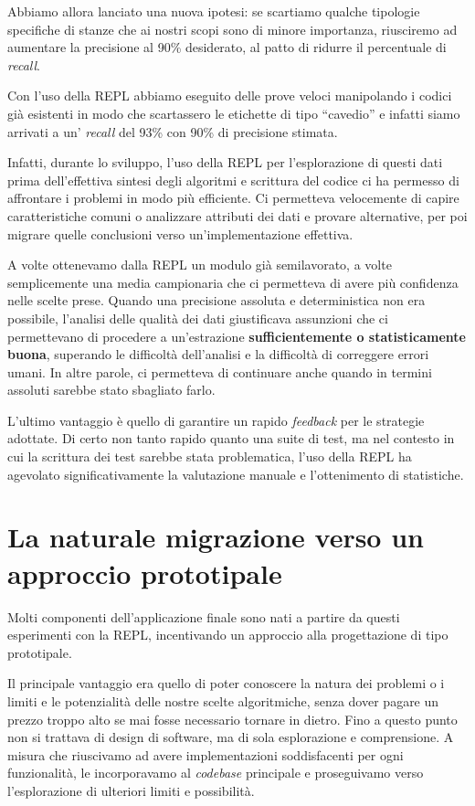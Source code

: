 \documentclass[12pt]{report}
\begin{document}
Abbiamo allora lanciato una nuova ipotesi: se scartiamo qualche tipologie specifiche di stanze che ai nostri scopi sono di minore importanza, riusciremo ad aumentare la precisione al 90\% desiderato, al patto di ridurre il percentuale di \textit{recall}.

Con l'uso della REPL abbiamo eseguito delle prove veloci manipolando i codici già esistenti in modo che scartassero le etichette di tipo ``cavedio'' e infatti siamo arrivati a un' \textit{recall} del 93\% con 90\% di precisione stimata.

Infatti, durante lo sviluppo, l'uso della REPL per l'esplorazione di questi dati prima dell'effettiva sintesi degli algoritmi e scrittura del codice ci ha permesso di affrontare i problemi in modo più efficiente. Ci permetteva velocemente di capire caratteristiche comuni o analizzare attributi dei dati e provare alternative, per poi migrare quelle conclusioni verso un'implementazione effettiva. 

A volte ottenevamo dalla REPL un modulo già semilavorato, a volte semplicemente una media campionaria che ci permetteva di avere più confidenza nelle scelte prese.
Quando una precisione assoluta e deterministica non era possibile, l'analisi delle qualità dei dati giustificava assunzioni che ci permettevano di procedere a un'estrazione \textbf{sufficientemente o statisticamente buona}, superando le difficoltà dell'analisi e la difficoltà di correggere errori umani. In altre parole, ci permetteva di continuare anche quando in termini assoluti sarebbe stato sbagliato farlo.

L'ultimo vantaggio è quello di garantire un rapido \textit{feedback} per le strategie adottate. Di certo non tanto rapido quanto una suite di test, ma nel contesto in cui la scrittura dei test sarebbe stata problematica, l'uso della REPL ha agevolato significativamente la valutazione manuale e l'ottenimento di statistiche.


\section{La naturale migrazione verso un approccio prototipale}

Molti componenti dell'applicazione finale sono nati a partire da questi esperimenti con la REPL, incentivando un approccio alla progettazione di tipo prototipale. 

Il principale vantaggio era quello di poter conoscere la natura dei problemi o i limiti e le potenzialità delle nostre scelte algoritmiche, senza dover pagare un prezzo troppo alto se mai fosse necessario tornare in dietro. Fino a questo punto non si trattava di design di software, ma di sola esplorazione e comprensione. A misura che riuscivamo ad avere implementazioni soddisfacenti per ogni funzionalità, le incorporavamo al \textit{codebase} principale e proseguivamo verso l'esplorazione di ulteriori limiti e possibilità.
\end{document}

